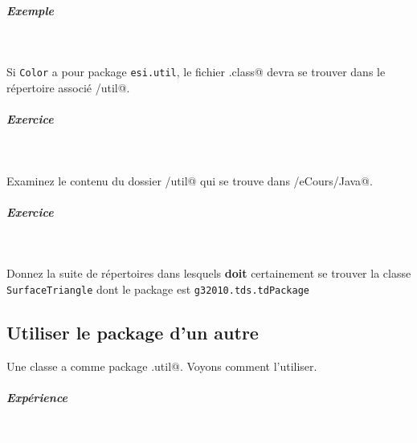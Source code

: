\documentclass[11pt,a4paper]{article}
\begin{document}
			
		\subparagraph{Exemple} 
		
					\textcolor{white}{.} \par
				
            \par
        
				Si \verb|Color| 
				a pour package \verb|esi.util|,
				le fichier \verb@Color.class@
				devra se trouver dans le r\'epertoire associ\'e 
				\verb@esi/util@.
			
            \par
        
			
		\subparagraph{Exercice} 
		
					\textcolor{white}{.} \par
				
            \par
        
				Examinez le contenu du dossier 
				\verb@esi/util@
				qui se trouve dans 
				\verb@/eCours/Java@.
			
            \par
        
			
		\subparagraph{Exercice} 
		
                \textcolor{white}{.} \par
            
						Donnez la suite de r\'epertoires dans lesquels 
						\textbf{doit} certainement
						se trouver la classe \verb|SurfaceTriangle|
						dont le package est \verb|g32010.tds.tdPackage| \textcolor{gray}{\underline{\hspace*{16em}}} \subsection{Utiliser le package d'un autre}
			Une classe
			\verb@Color@
			a comme package
			\verb@esi.util@.
			Voyons comment l'utiliser.			
		
            \par
        
			
		\subparagraph{Exp\'erience} 
		
					\textcolor{white}{.} \par
				
            \par
        
\end{document}
